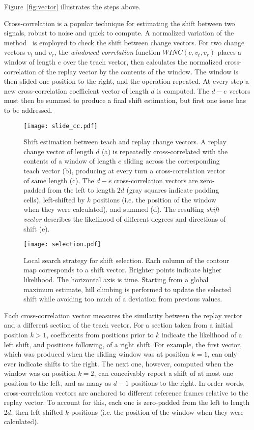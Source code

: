 \documentclass[twocolumn, 9pt,fleqn]{jsproceedings}
\begin{document}
Figure~\ref{fig:vector} illustrates the steps above.

Cross-correlation is a popular technique for estimating the shift between two signals, robust to noise and quick to compute. A normalized variation of the method~\cite{HEL14b} is employed to check the shift between change vectors. For two change vectors $v_t$ and $v_r$, the \textit{windowed correlation} function $WINC(e, v_t, v_r)$ places a window of length $e$ over the teach vector, then calculates the normalized cross-correlation of the replay vector by the contents of the window. The window is then slided one position to the right, and the operation repeated. At every step a new cross-correlation coefficient vector of length $d$ is computed. The $d - e$ vectors must then be summed to produce a final shift estimation, but first one issue has to be addressed.

\begin{figure}[h!]
\texttt{[image: slide\_cc.pdf]}
\caption{Shift estimation between teach and replay change vectors. A replay change vector of length $d$ (a) is repeatedly cross-correlated with the contents of a window of length $e$ sliding across the corresponding teach vector (b), producing at every turn a cross-correlation vector of same length (c). The $d - e$ cross-correlation vectors are zero-padded from the left to length $2d$ (gray squares indicate padding cells), left-shifted by $k$ positions (i.e. the position of the window when they were calculated), and summed (d). The resulting \textit{shift vector} describes the likelihood of different degrees and directions of shift (e).}
\label{fig:slide_cc}
\end{figure}

\begin{figure}[h!]
\texttt{[image: selection.pdf]}
\caption{Local search strategy for shift selection. Each column of the contour map corresponds to a shift vector. Brighter points indicate higher likelihood. The horizontal axis is time. Starting from a global maximum estimate, hill climbing is performed to update the selected shift while avoiding too much of a deviation from previous values.}
\label{fig:selection}
\end{figure}

Each cross-correlation vector measures the similarity between the replay vector and a different section of the teach vector. For a section taken from a initial position $k > 1$, coefficients from positions prior to $k$ indicate the likelihood of a left shift, and positions following, of a right shift. For example, the first vector, which was produced when the sliding window was at position $k = 1$, can only ever indicate shifts to the right. The next one, however, computed when the window was on position $k = 2$, can conceivably report a shift of at most one position to the left, and as many as $d-1$ positions to the right. In order words, cross-correlation vectors are anchored to different reference frames relative to the replay vector. To account for this, each one is zero-padded from the left to length $2d$, then left-shifted $k$ positions (i.e. the position of the window when they were calculated).
\end{document}
